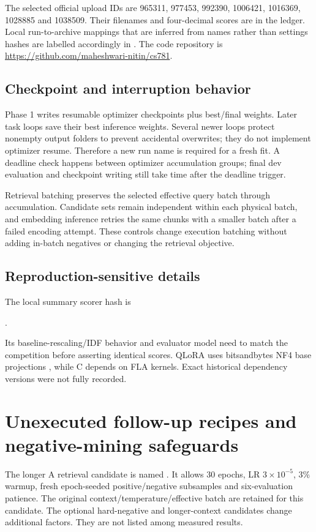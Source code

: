 The selected official upload IDs are 965311, 977453, 992390, 1006421, 1016369, 1028885 and 1038509.
Their filenames and four-decimal scores are in the ledger. Local run-to-archive mappings that are inferred
from names rather than settings hashes are labelled accordingly in .
The code repository is \url{https://github.com/maheshwari-nitin/cs781}.

\subsection{Checkpoint and interruption behavior}
Phase 1 writes resumable optimizer checkpoints plus best/final weights. Later task loops save their best
inference weights. Several newer loops protect nonempty output folders to prevent accidental overwrites;
they do not implement optimizer resume. Therefore a new run name is required for a fresh fit. A deadline
check happens between optimizer accumulation groups; final dev evaluation and checkpoint writing still
take time after the deadline trigger.

Retrieval batching preserves the selected effective query batch through accumulation. Candidate
sets remain independent within each physical batch, and embedding inference retries the same chunks
with a smaller batch after a failed encoding attempt. These controls change execution batching without
adding in-batch negatives or changing the retrieval objective.

\subsection{Reproduction-sensitive details}
The local summary scorer hash is
\begin{center}\small{}.\end{center}
Its baseline-rescaling/IDF behavior and evaluator model need to match the competition before asserting
identical scores. QLoRA uses bitsandbytes NF4 base projections \cite{bnb}, while C depends on FLA kernels.
Exact historical dependency versions were not fully recorded.

\section{Unexecuted follow-up recipes and negative-mining safeguards}
The longer A retrieval candidate is named . It allows 30 epochs, LR
$3\times10^{-5}$, 3\% warmup, fresh epoch-seeded positive/negative subsamples and six-evaluation patience.
The original context/temperature/effective batch are retained for this candidate. The optional hard-negative
and longer-context candidates change additional factors. They are not listed among measured results.

